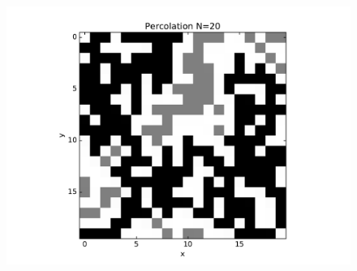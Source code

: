 \documentclass[12pt]{article}
\begin{document}
\begin{figure}[H]
  \label{delta02}
\endminipage\hfill
{}
  \includegraphics[width=\linewidth]{percolation_20.pdf}
  \label{delta02}
\endminipage\hfill
\end{figure}
\clearpage
\end{document}
